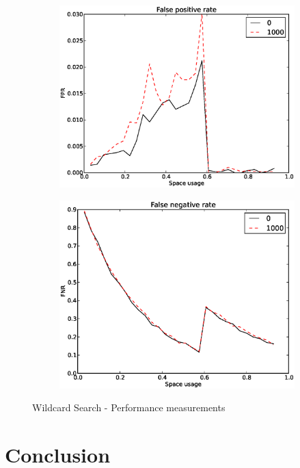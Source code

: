 \documentclass[a4paper,11pt]{article}
\begin{document}
\begin{figure}[H]
\centering
\begin{subfigure}{.5\textwidth}
  \label{fig:w-query-performance}
  \centering
  \includegraphics[width=.95\linewidth]{wildcard_1000_FPR1}
  \caption{}
\end{subfigure}%
\begin{subfigure}{.5\textwidth}
  \label{fig:w-short-circuit}
  \centering
  \includegraphics[width=.95\linewidth]{wildcard_1000_FNR1}
  \caption{}
\end{subfigure}
  \caption{Wildcard Search - Performance measurements}
  \label{fig:w-perf}
\end{figure}


\section{Conclusion}
\newpage
\end{document}
